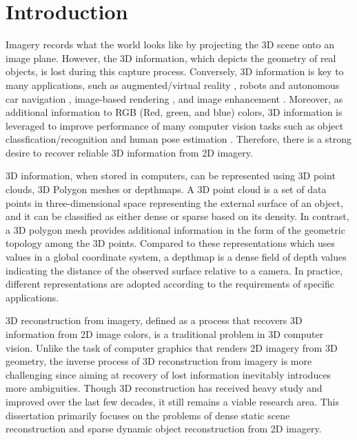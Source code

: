 

\chapter{Introduction}

Imagery records what the world looks like by projecting the 3D scene onto an image plane. However, the 3D information, which depicts the geometry of real objects, is lost during this capture process. Conversely,   3D information is key to many applications, such as augmented/virtual reality \cite{ventura2008depth}, robots and autonomous car navigation \cite{endres2012evaluation}, image-based rendering \cite{View_interpolation1993}, and image enhancement \cite{zhang2014personal}. Moreover, as additional information to RGB (Red, green, and blue) colors, 3D information is leveraged to improve performance of many computer vision tasks such as object classfication/recognition \cite{gupta2013perceptual}  and human pose estimation \cite{CVPR_kinect}. Therefore, there is a strong desire to recover reliable 3D information from 2D imagery.

3D information, when stored in computers, can be represented using 3D point clouds, 3D Polygon meshes or depthmaps. A 3D point cloud is a set of data points in three-dimensional space representing the external surface of an object, and it can be classified as either dense or sparse based on its density. In contrast, a 3D polygon mesh provides additional information in the form of the geometric topology among the 3D points. Compared to these representations which uses values in a global coordinate system, a depthmap is a dense field of depth values indicating the distance of the observed surface relative to a camera. In practice, different representations are adopted according to the requirements of specific applications. 

3D reconstruction from imagery, defined as a process that recovers 3D information from 2D image colors, is a traditional problem in 3D computer vision. Unlike the task of computer graphics that renders 2D imagery from 3D geometry, the inverse process of 3D reconstruction from imagery is more challenging since aiming at recovery of lost information inevitably introduces more ambiguities. Though 3D reconstruction has received heavy study and improved over the last few decades, it still remains a viable research area. This dissertation primarily focuses on the problems of dense static scene reconstruction and sparse dynamic object reconstruction from 2D imagery.

